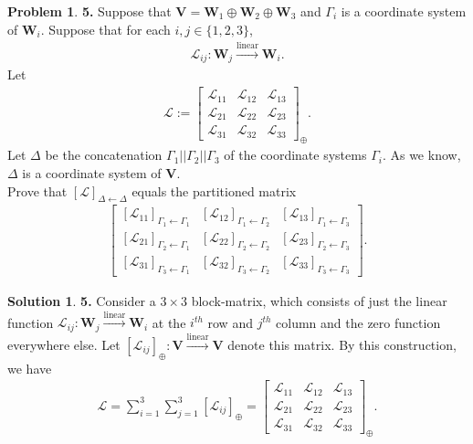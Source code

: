 \documentclass{book}
\theoremstyle{definition}
\newtheorem*{prob*}{Problem}
\newtheorem*{sln*}{Solution}
\newcommand{\V}{\mathbf{V}}
\newcommand{\W}{\mathbf{W}}
\newcommand{\lag}{\mathcal{L}}
\newcommand{\lin}{\overset{\text{linear}}{\longrightarrow}}
\begin{document}
\begin{prob*}\textbf{5.} Suppose that $\V = \W_1 \oplus \W_2 \oplus \W_3$ and $\Gamma_i$ is a coordinate system of $\W_i$. Suppose that for each $i,j \in \{1,2,3 \}$, 
	\begin{align*}
	\lag_{ij} : \W_j \overset{\text{linear}}{\longrightarrow} \W_i.
	\end{align*}
	Let 
	\begin{align*}
	\lag := \begin{bmatrix}
	\lag_{11} & \lag_{12} & \lag_{13}\\
	\lag_{21} & \lag_{22} & \lag_{23}\\
	\lag_{31} & \lag_{32} & \lag_{33}
	\end{bmatrix}_\oplus.
	\end{align*}
	Let $\Delta$ be the concatenation $\Gamma_1 \vert\vert \Gamma_2\vert\vert \Gamma_3$ of the coordinate systems $\Gamma_i$. As we know, $\Delta$ is a coordinate system of $\V$. \\
	
	Prove that $[\lag]_{\Delta \leftarrow \Delta}$ equals the partitioned matrix
	\begin{align*}
	\begin{bmatrix}
	[\lag_{11}]_{\Gamma_1 \leftarrow \Gamma_1} & [\lag_{12}]_{\Gamma_1 \leftarrow \Gamma_2} & [\lag_{13}]_{\Gamma_1 \leftarrow \Gamma_3}\\
	[\lag_{21}]_{\Gamma_2 \leftarrow \Gamma_1} & [\lag_{22}]_{\Gamma_2 \leftarrow \Gamma_2} & [\lag_{23}]_{\Gamma_2 \leftarrow \Gamma_3}\\
	[\lag_{31}]_{\Gamma_3 \leftarrow \Gamma_1} & [\lag_{32}]_{\Gamma_3 \leftarrow \Gamma_2} & [\lag_{33}]_{\Gamma_3 \leftarrow \Gamma_3}
	\end{bmatrix}.
	\end{align*}
	 
	
	\begin{sln*}\textbf{5.} Consider a $3\times 3$ block-matrix, which consists of just the linear function $\lag_{ij} : \W_j \lin \W_i$ at the $i^{th}$ row and $j^{th}$ column and the zero function everywhere else. Let $[\lag_{ij}]_\oplus : \V \lin \V$ denote this matrix. By this construction, we have
		\begin{align*}
		\lag = \sum^3_{i=1}\sum^3_{j=1}[\lag_{ij}]_\oplus = \begin{bmatrix}
		\lag_{11} & \lag_{12} & \lag_{13}\\
		\lag_{21} & \lag_{22} & \lag_{23}\\
		\lag_{31} & \lag_{32} & \lag_{33}
		\end{bmatrix}_\oplus.
		\end{align*}
	

\end{sln*}
\end{prob*}
\end{document}
